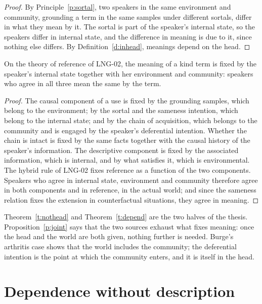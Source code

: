 \documentclass{situationist-preprint}
\begin{document}
\begin{proof}
By Principle~\ref{p:sortal}, two speakers in the same environment and community, grounding a term in the same samples under different sortals, differ in what they mean by it. The sortal is part of the speaker's internal state, so the speakers differ in internal state, and the difference in meaning is due to it, since nothing else differs. By Definition~\ref{d:inhead}, meanings depend on the head.
\end{proof}

\begin{proposition}\label{p:joint}
On the theory of reference of LNG-02, the meaning of a kind term is fixed by the speaker's internal state together with her environment and community: speakers who agree in all three mean the same by the term.
\end{proposition}

\begin{proof}
The causal component of a use is fixed by the grounding samples, which belong to the environment; by the sortal and the sameness intention, which belong to the internal state; and by the chain of acquisition, which belongs to the community and is engaged by the speaker's deferential intention. Whether the chain is intact is fixed by the same facts together with the causal history of the speaker's information. The descriptive component is fixed by the associated information, which is internal, and by what satisfies it, which is environmental. The hybrid rule of LNG-02 fixes reference as a function of the two components. Speakers who agree in internal state, environment and community therefore agree in both components and in reference, in the actual world; and since the sameness relation fixes the extension in counterfactual situations, they agree in meaning.
\end{proof}

Theorem~\ref{t:nothead} and Theorem~\ref{t:depend} are the two halves of the thesis. Proposition~\ref{p:joint} says that the two sources exhaust what fixes meaning: once the head and the world are both given, nothing further is needed. Burge's arthritis case shows that the world includes the community; the deferential intention is the point at which the community enters, and it is itself in the head.

\section{Dependence without description}
\end{document}
